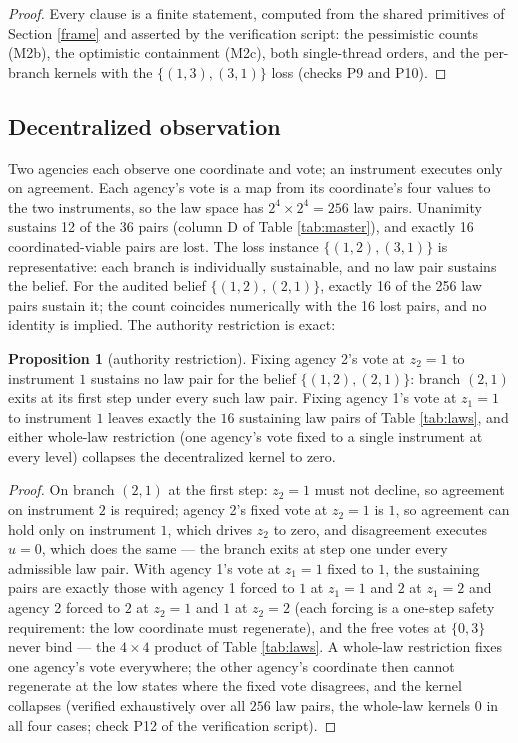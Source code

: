 \documentclass[10pt,twocolumn]{article}
\theoremstyle{definition}
\newtheorem{proposition}{Proposition}
\begin{document}
\begin{proof}
Every clause is a finite statement, computed from the shared primitives
of Section \ref{frame} and asserted by the verification script: the
pessimistic counts (M2b), the optimistic containment (M2c), both
single-thread orders, and the per-branch kernels with the
\(\{(1,3),(3,1)\}\) loss (checks P9 and P10).
\end{proof}

\subsection{Decentralized observation}\label{decentralized}

Two agencies each observe one coordinate and vote; an instrument
executes only on agreement. Each agency's vote is a map from its
coordinate's four values to the two instruments, so the law space has
\(2^{4} \times 2^{4} = 256\) law pairs. Unanimity sustains 12 of the
36 pairs (column D of Table \ref{tab:master}), and exactly 16
coordinated-viable pairs are lost. The loss instance
\(\{(1,2),(3,1)\}\) is representative: each branch is individually
sustainable, and no law pair sustains the belief. For the audited belief
\(\{(1,2),(2,1)\}\), exactly 16 of the 256 law pairs sustain it; the
count coincides numerically with the 16 lost pairs, and no identity is
implied. The authority restriction is exact:

\begin{proposition}[authority restriction]\label{prop:authority}
Fixing agency 2's vote at \(z_2 = 1\) to instrument \(1\) sustains no
law pair for the belief \(\{(1,2),(2,1)\}\): branch \((2,1)\) exits
at its first step under every such law pair. Fixing agency 1's vote at
\(z_1 = 1\) to instrument \(1\) leaves exactly the \(16\) sustaining
law pairs of Table \ref{tab:laws}, and either whole-law
restriction (one agency's vote fixed to a single instrument at every
level) collapses the decentralized kernel to zero.
\end{proposition}

\begin{proof}
On branch \((2,1)\) at the first step: \(z_2 = 1\) must not
decline, so agreement on instrument \(2\) is required; agency 2's
fixed vote at \(z_2 = 1\) is \(1\), so agreement can hold only on
instrument \(1\), which drives \(z_2\) to zero, and disagreement
executes \(u = 0\), which does the same --- the branch exits at step
one under every admissible law pair. With agency 1's vote at \(z_1 = 1\) fixed to \(1\), the
sustaining pairs are exactly those with agency 1 forced to \(1\) at
\(z_1 = 1\) and \(2\) at \(z_1 = 2\) and agency 2 forced to \(2\)
at \(z_2 = 1\) and \(1\) at \(z_2 = 2\) (each forcing is a
one-step safety requirement: the low coordinate must regenerate), and
the free votes at \(\{0, 3\}\) never bind --- the \(4 \times 4\)
product of Table \ref{tab:laws}. A whole-law restriction
fixes one agency's vote everywhere; the other agency's coordinate then
cannot regenerate at the low states where the fixed vote disagrees, and
the kernel collapses (verified exhaustively over all \(256\) law pairs, the whole-law
kernels \(0\) in all four cases; check P12 of the verification script).
\end{proof}
\end{document}

